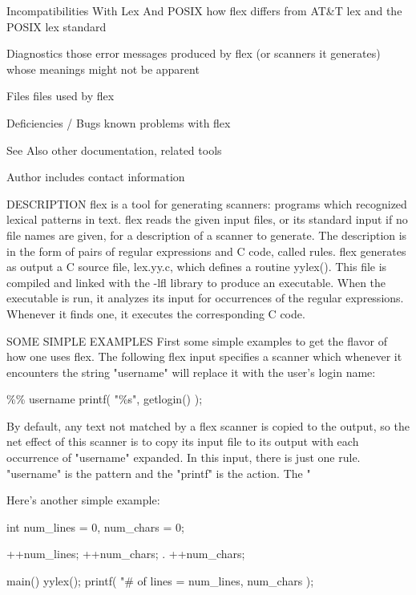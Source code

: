 \documentclass[12pt,spanish,twocolumn,lettersize]{article}
\begin{document}
	   Incompatibilities With Lex And POSIX
	       how flex differs from AT&T lex and the POSIX lex standard

	   Diagnostics
	       those error messages produced by flex (or scanners it generates) whose meanings might not be apparent

	   Files
	       files used by flex

	   Deficiencies / Bugs
	       known problems with flex

	   See Also
	       other documentation, related tools

	   Author
	       includes contact information

DESCRIPTION
       flex is a tool for  generating  scanners:  programs  which recognized lexical patterns in text.  flex reads the given input files, or its standard input if no file  names  are given,  for  a  description of a scanner to generate.  The description is in the form of pairs of regular expressions and  C  code,  called  rules. flex generates as output a C source file, lex.yy.c, which defines  a	routine	 yylex().
       This  file is compiled and linked with the -lfl library to produce an executable.  When the	 executable  is	 run,  it
       analyzes	 its input for occurrences of the regular expressions.  Whenever it finds one, it executes the corresponding C code.

SOME SIMPLE EXAMPLES
       First  some  simple  examples to get the flavor of how one
       uses flex.  The following flex input specifies  a  scanner
       which  whenever	it  encounters the string "username" will
       replace it with the user's login name:

	   \%\%
	   username    printf( "\%s", getlogin() );

       By default, any text not matched	 by  a	flex  scanner  is
       copied to the output, so the net effect of this scanner is
       to copy its input file to its output with each  occurrence
       of  "username" expanded.	 In this input, there is just one
       rule.  "username" is the pattern and the "printf"  is  the
       action.	The "%

       Here's another simple example:

		   int num_lines = 0, num_chars = 0;

	   \n	   ++num_lines; ++num_chars;
	   .	   ++num_chars;

	   main()
		   {
		   yylex();
		   printf( "# of lines = %
			   num_lines, num_chars );
		   }
\end{document}
